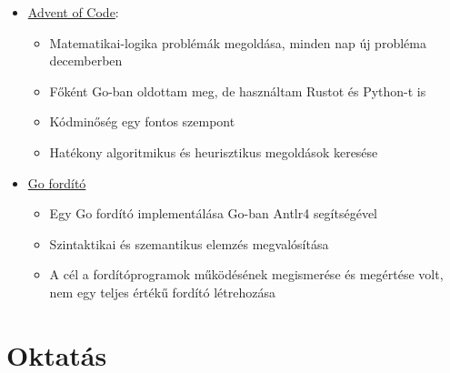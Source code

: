 \documentclass[letterpaper]{twentysecondcv} %
\begin{document}
\begin{itemize}
	\item \href{https://github.com/taskat/aoc}{Advent of Code}:
	      \begin{itemize}[parsep=0.1em]
		      \item Matematikai-logika problémák megoldása, minden nap új probléma decemberben
		      \item Főként Go-ban oldottam meg, de használtam Rustot és Python-t is
		      \item Kódminőség egy fontos szempont
		      \item Hatékony algoritmikus és heurisztikus megoldások keresése
	      \end{itemize}
	\item \href{https://github.com/taskat/gopp}{Go fordító}
	      \begin{itemize}[parsep=0.1em]
		      \item Egy Go fordító implementálása Go-ban Antlr4 segítségével
		      \item Szintaktikai és szemantikus elemzés megvalósítása
		      \item A cél a fordítóprogramok működésének megismerése és megértése volt, nem egy teljes értékű fordító létrehozása
	      \end{itemize}
\end{itemize}



\section{Oktatás}

\begin{twenty} %
\end{twenty}
\end{document}

